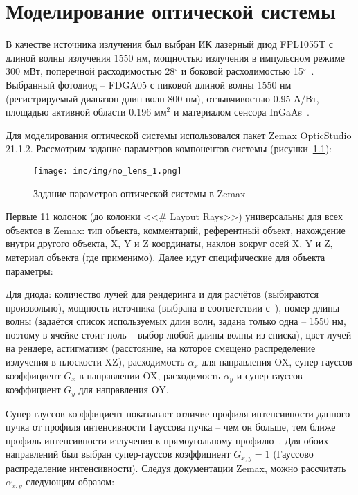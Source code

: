 \chapter{Моделирование оптической системы}

В качестве источника излучения был выбран ИК лазерный диод FPL1055T с длиной волны излучения 1550 нм, мощностью излучения в импульсном режиме 300 мВт, поперечной расходимостью 28${}^\circ$ и боковой расходимостью 15${}^\circ$~\cite{LDThorlabs}. Выбранный фотодиод \--- FDGA05 с пиковой длиной волны 1550 нм (регистрируемый диапазон длин волн 800 нм), отзывчивостью 0.95 А/Вт, площадью активной области 0.196 мм${}^2$ и материалом сенсора InGaAs~\cite{PDThorlabs}.

Для моделирования оптической системы использовался пакет Zemax OpticStudio 21.1.2. Рассмотрим задание параметров компонентов системы (рисунки~\ref{fig:no_lens_zemax_1}):

\begin{figure}[!h]
    \centering
    \texttt{[image: inc/img/no\_lens\_1.png]}
    \caption{Задание параметров оптической системы в Zemax}
    \label{fig:no_lens_zemax_1}
\end{figure}

Первые 11 колонок (до колонки <<\# Layout Rays>>) универсальны для всех объектов в Zemax: тип объекта, комментарий, референтный объект, нахождение внутри другого объекта, X, Y и Z координаты, наклон вокруг осей X, Y и Z, материал объекта (где применимо). Далее идут специфические для объекта параметры:

Для диода: количество лучей для рендеринга и для расчётов (выбираются произвольно), мощность источника (выбрана в соответствии с~\cite{LDThorlabs}), номер длины волны (задаётся список используемых длин волн, задана только одна \--- 1550 нм, поэтому в ячейке стоит ноль \--- выбор любой длины волны из списка), цвет лучей на рендере, астигматизм (расстояние, на которое смещено распределение излучения в плоскости XZ), расходимость $\alpha_x$ для направления OX, супер-гауссов коэффициент $G_x$ в направлении OX, расходимость $\alpha_y$ и супер-гауссов коэффициент $G_y$ для направления OY. 

Супер-гауссов коэффициент показывает отличие профиля интенсивности данного пучка от профиля интенсивности Гауссова пучка \--- чем он больше, тем ближе профиль интенсивности излучения к прямоугольному профилю~\cite{Paschotta2008}. Для обоих направлений был выбран супер-гауссов коэффициент $G_{x,y} = 1$ (Гауссово распределение интенсивности). Следуя документации Zemax, можно рассчитать $\alpha_{x,y}$ следующим образом: 

